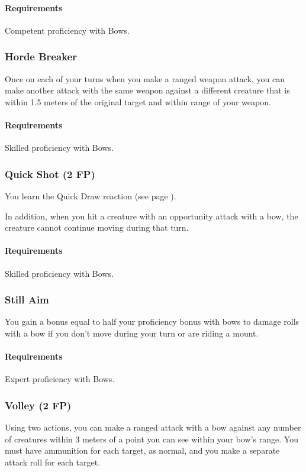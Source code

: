     \paragraph{Requirements} Competent proficiency with Bows.
\subsubsection{Horde Breaker} \label{feat::hordebreaker}
    Once on each of your turns when you make a ranged weapon attack, you can make another attack with the same weapon against a different creature that is within 1.5 meters of the original target and within range of your weapon.
    \paragraph{Requirements} Skilled proficiency with Bows.
\subsubsection{Quick Shot (2 FP)} \label{feat::quickshot}
    You learn the Quick Draw reaction (see page \pageref{act::quickdraw}).

    In addition, when you hit a creature with an opportunity attack with a bow, the creature cannot continue moving during that turn.
    \paragraph{Requirements} Skilled proficiency with Bows.
\subsubsection{Still Aim} \label{feat::stillaim}
    You gain a bonus equal to half your proficiency bonus with bows to damage rolls with a bow if you don't move during your turn or are riding a mount.
    \paragraph{Requirements} Expert proficiency with Bows.
\subsubsection{Volley (2 FP)} \label{feat::volley}
    Using two actions, you can make a ranged attack with a bow against any number of creatures within 3 meters of a point you can see within your bow's range.
    You must have ammunition for each target, as normal, and you make a separate attack roll for each target.
